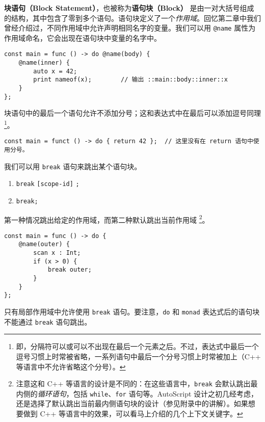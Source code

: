 \textbf{块语句（Block Statement）}，也被称为\textbf{语句块（Block）} 是由一对大括号组成的结构，其中包含了零到多个语句。语句块定义了一个\emph{作用域}。回忆第二章中我们曾经介绍过，不同作用域中允许声明相同名字的变量。我们可以用 \lstinline!@name! 属性为作用域命名，它会出现在语句块中变量的名字中。

\begin{lstlisting}
const main = func () -> do @name(body) {
    @name(inner) {
        auto x = 42;
        print nameof(x);		// 输出 ::main::body::inner::x
    }
};
\end{lstlisting}

块语句中的最后一个语句允许不添加分号；这和表达式中在最后可以添加逗号同理 \footnote{即，分隔符可以或可以不出现在最后一个元素之后。不过，表达式中最后一个逗号习惯上时常被省略，一系列语句中最后一个分号习惯上时常被加上（C++ 等语言中不允许省略这个分号）。}。

\begin{lstlisting}
const main = funct () -> do { return 42 };	// 这里没有在 return 语句中使用分号。
\end{lstlisting}

我们可以用 \lstinline!break! 语句来跳出某个语句块。

\begin{grammar} \label{grm:break-statement}
\begin{enumerate}
	\item \lstinline!break! \texttt{[scope-id]} \lstinline!;!
	\item \lstinline!break;!
\end{enumerate}
\end{grammar}

第一种情况跳出给定的作用域，而第二种默认跳出当前作用域 \footnote{注意这和 C++ 等语言的设计是不同的：在这些语言中，\lstinline!break! 会默认跳出最内侧的\emph{循环语句}，包括 \lstinline!while!、\lstinline!for! 语句等。AutoScript 设计之初几经考虑，还是选择了默认跳出当前最内侧语句块的设计（参见附录中的讲解）。如果想要做到 C++ 等语言中的效果，可以看马上介绍的几个上下文关键字。}。

\begin{lstlisting}
const main = func () -> do {
    @name(outer) {
        scan x : Int;
        if (x > 0) {
            break outer;
        }
    }
};
\end{lstlisting}

只有局部作用域中允许使用 \lstinline!break! 语句。要注意，\lstinline!do! 和 \lstinline!monad! 表达式后的语句块不能通过 \lstinline!break! 语句跳出。 \\

